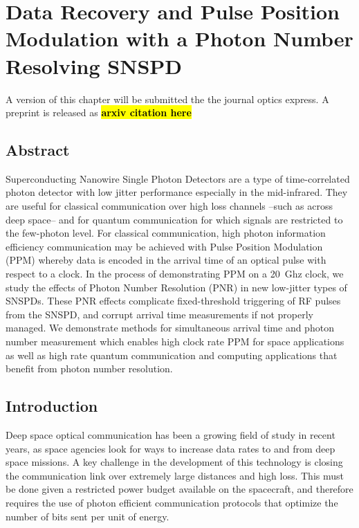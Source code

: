 \documentclass[11pt]{caltech_thesis} %
\begin{document}
\hypertarget{data-recovery-and-pulse-position-modulation-with-a-photon-number-resolving-snspd}{%
\chapter{Data Recovery and Pulse Position Modulation with a Photon Number Resolving SNSPD}\label{data-recovery-and-pulse-position-modulation-with-a-photon-number-resolving-snspd}}

A version of this chapter will be submitted the the journal optics express. A preprint is released as \textbf{\hl{arxiv citation here}}

\hypertarget{abstract-2}{%
\section{Abstract}\label{abstract-2}}

Superconducting Nanowire Single Photon Detectors are a type of time-correlated photon detector with low jitter performance especially in the mid-infrared. They are useful for classical communication over high loss channels --such as across deep space-- and for quantum communication for which signals are restricted to the few-photon level. For classical communication, high photon information efficiency communication may be achieved with Pulse Position Modulation (PPM) whereby data is encoded in the arrival time of an optical pulse with respect to a clock. In the process of demonstrating PPM on a 20~Ghz clock, we study the effects of Photon Number Resolution (PNR) in new low-jitter types of SNSPDs. These PNR effects complicate fixed-threshold triggering of RF pulses from the SNSPD, and corrupt arrival time measurements if not properly managed. We demonstrate methods for simultaneous arrival time and photon number measurement which enables high clock rate PPM for space applications as well as high rate quantum communication and computing applications that benefit from photon number resolution.

\hypertarget{introduction-3}{%
\section{Introduction}\label{introduction-3}}

Deep space optical communication has been a growing field of study in recent years, as space agencies look for ways to increase data rates to and from deep space missions. A key challenge in the development of this technology is closing the communication link over extremely large distances and high loss. This must be done given a restricted power budget available on the spacecraft, and therefore requires the use of photon efficient communication protocols that optimize the number of bits sent per unit of energy.
\end{document}
